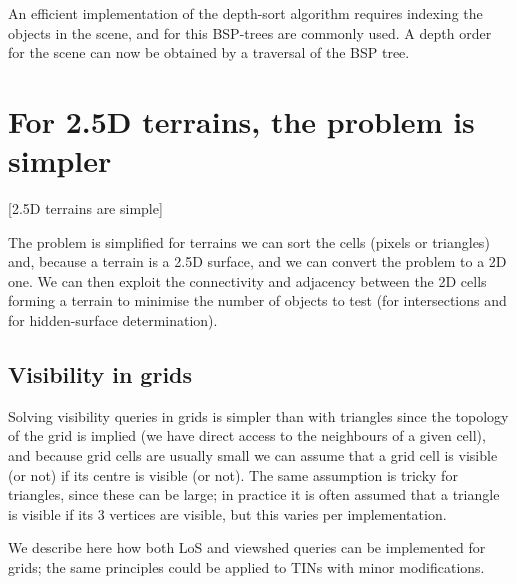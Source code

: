 
An efficient implementation of the depth-sort algorithm requires indexing the objects in the scene, and for this BSP-trees are commonly used.
A depth order for the scene can now be obtained by a traversal of the BSP tree.



%
\section{For 2.5D terrains, the problem is simpler}[2.5D terrains are simple]

The problem is simplified for terrains we can sort the cells (pixels or triangles) and, because a terrain is a 2.5D surface, and we can convert the problem to a 2D one.
We can then exploit the connectivity and adjacency between the 2D cells forming a terrain to minimise the number of objects to test (for intersections and for hidden-surface determination).


%
\subsection{Visibility in grids}

Solving visibility queries in grids is simpler than with triangles since the topology of the grid is implied (we have direct access to the neighbours of a given cell), and because grid cells are usually small we can assume that a grid cell is visible (or not) if its centre is visible (or not).
The same assumption is tricky for triangles, since these can be large; in practice it is often assumed that a triangle is visible if its 3 vertices are visible, but this varies per implementation.

%

We describe here how both LoS and viewshed queries can be implemented for grids; the same principles could be applied to TINs with minor modifications.


